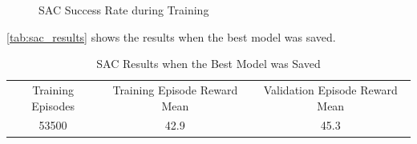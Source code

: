 \begin{figure}[H]%
    \centering
    {\fontsize{8}{11}\selectfont}
    \caption{SAC Success Rate during Training}
    \label{fig:success_rate}
\end{figure}

\autoref{tab:sac_results} shows the results when the best model was saved.

\begin{table}[ht] 
\centering
\caption{SAC Results when the Best Model was Saved}
\label{tab:sac_results}
\begin{tabular}{ccc}
\toprule
\multirow{2}{0.25\textwidth}{\centering Training Episodes} & \multirow{2}{0.25\textwidth}{\centering Training Episode Reward Mean} & \multirow{2}{0.25\textwidth}{\centering Validation Episode Reward Mean} \\
& & \\
\midrule
53500 & 42.9 & 45.3\\
\bottomrule
\end{tabular}
\end{table}

